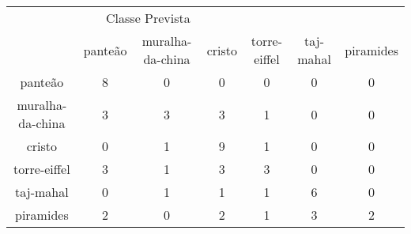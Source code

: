\begin{tabular}{|c|c|c|c|c|c|c|}
\hline
\multicolumn{5}{|c|}{Classe Prevista}\\
 & panteão & muralha-da-china & cristo & torre-eiffel & taj-mahal & piramides\\
panteão & 8 & 0 & 0 & 0 & 0 & 0\\
muralha-da-china & 3 & 3 & 3 & 1 & 0 & 0\\
cristo & 0 & 1 & 9 & 1 & 0 & 0\\
torre-eiffel & 3 & 1 & 3 & 3 & 0 & 0\\
taj-mahal & 0 & 1 & 1 & 1 & 6 & 0\\
piramides & 2 & 0 & 2 & 1 & 3 & 2\\
\end{tabular}
